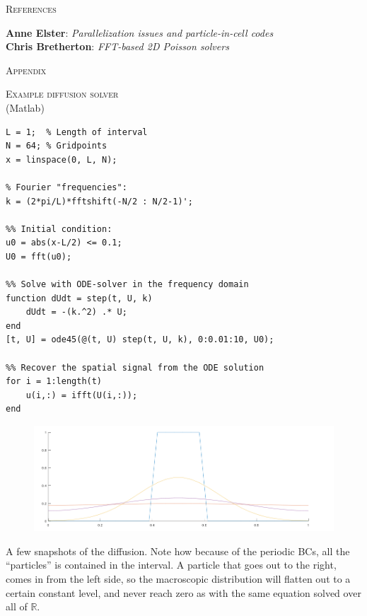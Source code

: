 \documentclass[14pt]{beamer}
\begin{document}
\begin{frame}
    \centering

    \textsc{References}\\[1em]

    \raggedright
    \scriptsize
    \textbf{Anne Elster}: \textit{Parallelization issues and particle-in-cell codes}\\[1em]

    \textbf{Chris Bretherton}: \textit{FFT-based 2D Poisson solvers}
\end{frame}

\begin{frame}
    \centering
    \textsc{Appendix}
\end{frame}

\begin{frame}[fragile]
    \centering
    \textsc{Example diffusion solver}\\
    \tiny (Matlab)
    \begin{lstlisting}[style=Matlab]
L = 1;  % Length of interval
N = 64; % Gridpoints
x = linspace(0, L, N);

% Fourier "frequencies":
k = (2*pi/L)*fftshift(-N/2 : N/2-1)';

%% Initial condition:
u0 = abs(x-L/2) <= 0.1;
U0 = fft(u0);

%% Solve with ODE-solver in the frequency domain
function dUdt = step(t, U, k)
    dUdt = -(k.^2) .* U;
end
[t, U] = ode45(@(t, U) step(t, U, k), 0:0.01:10, U0);

%% Recover the spatial signal from the ODE solution
for i = 1:length(t)
    u(i,:) = ifft(U(i,:));
end
    \end{lstlisting}
\end{frame}

\begin{frame}
    \begin{figure}
        \centering
        \includegraphics[width=\textwidth]{diff}
    \end{figure}
    \tiny
    A few snapshots of the diffusion. Note how because of the periodic BCs,
    all the ``particles'' is contained in the interval. A particle that goes
    out to the right, comes in from the left side, so the macroscopic distribution
    will flatten out to a certain constant level, and never reach zero as with
    the same equation solved over all of $\mathbb R$.
\end{frame}
\end{document}
